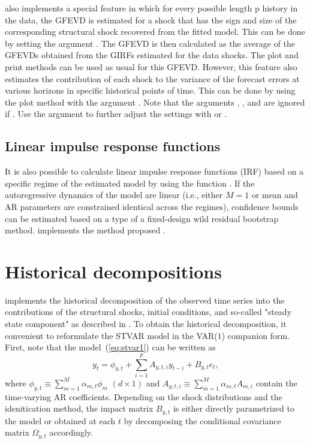 \documentclass[nojss]{jss}
\begin{document}
 also implements a special feature in which for every possible length p history in the data, the GFEVD is estimated for a shock that has the sign and size of the corresponding structural shock recovered from the fitted model. This can be done by setting the argument . The GFEVD is then calculated as the average of the GFEVDs obtained from the GIRFs estimated for the data shocks. The plot and print methods can be used as usual for this GFEVD. However, this feature also estimates the contribution of each shock to the variance of the forecast errors at various horizons in specific historical points of time. This can be done by using the plot method with the argument . Note that the arguments , , and  are ignored if . Use the argument  to further adjust the settings with  or .


\subsection{Linear impulse response functions}

It is also possible to calculate linear impulse response functions (IRF) based on a specific regime of the estimated model by using the function . If the autoregressive dynamics of the model are linear (i.e., either $M=1$ or mean and AR parameters are constrained identical across the regimes), confidence bounds can be estimated based on a type of a fixed-design wild residual bootstrap method.  implements the method proposed \cite{Herwartz+Lutkepohl:2014}.


\section{Historical decompositions}\label{sec:histdecomp}

 implements the historical decomposition of the observed time series into the contributions of the structural shocks, initial conditions, and so-called "steady state component" as described in \cite{Wong:2018}. To obtain the historical decomposition, it convenient to reformulate the STVAR model in the VAR($1$) companion form. First, note that  the model~(\ref{eq:stvar1}) can be written as
\begin{equation}\label{eq:stvarsimp}
y_t = \phi_{y,t} + \sum_{i=1}^p A_{y,t,i}y_{t-i} + B_{y,t}e_t,
\end{equation}
where $\phi_{y,t} \equiv \sum_{m=1}^M \alpha_{m,t}\phi_{m}$ $(d\times 1)$ and $A_{y,t,i}\equiv \sum_{m=1}^M\alpha_{m,t}A_{m,i}$ contain the time-varying AR coefficients. Depending on the shock distributions and the idenitication method, the impact matrix $B_{y,t}$ is either directly parametrized to the model or obtained at each $t$ by decomposing the conditional covariance matrix $\Omega_{y,t}$ accordingly.
\end{document}
